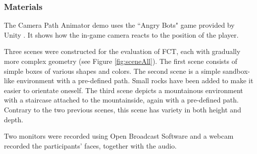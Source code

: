 \subsubsection{Materials}
The Camera Path Animator \cite{unity_camTool} demo uses the ``Angry Bots" game provided by Unity \cite{angryBots}. It shows how the in-game camera reacts to the position of the player.


Three scenes were constructed for the evaluation of FCT, each with gradually more complex geometry (see Figure \ref{fig:sceneAll}). The first scene consists of simple boxes of various shapes and colors. The second scene is a simple sandbox-like environment with a pre-defined path. Small rocks have been added to make it easier to orientate oneself. The third scene depicts a mountainous environment with a staircase attached to the mountainside, again with a pre-defined path. Contrary to the two previous scenes, this scene has variety in both height and depth.


Two monitors were recorded using Open Broadcast Software \cite{obs_cam} and a webcam recorded the participants' faces, together with the audio.

